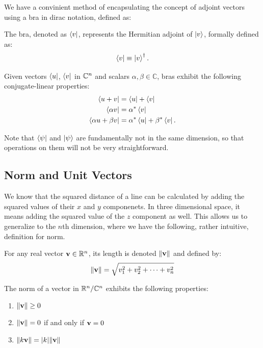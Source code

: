 \documentclass[12pt]{article}
\begin{document}
We have a convinient method of encapsulating the concept of adjoint vectors using a bra in dirac notation, defined as:

\begin{definition}[Bra]
The bra, denoted as $\bra{v}$, represents the Hermitian adjoint of $\ket{v}$, formally defined as:
\[
\bra{v} \equiv \ket{v}^\dagger.
\]
\end{definition}

\begin{theorem}
    Given vectors $\bra{u}$, $\bra{v}$ in $\mathbb{C}^n$ and scalars $\alpha, \beta \in \mathbb{C}$, bras exhibit the following conjugate-linear properties:
        \begin{align}
        \bra{u + v} &= \bra{u} + \bra{v}\\
        \bra{\alpha v} &= \alpha^* \bra{v}\\
        \bra{\alpha u + \beta v} &= \alpha^* \bra{u} + \beta^* \bra{v}.
        \end{align}
\end{theorem}

Note that $\bra{\psi}$ and $\ket{\psi}$ are fundamentally not in the same dimension, so that operations on them will not be very straightforward. 

\subsection{Norm and Unit Vectors}

We know that the squared distance of a line can be calculated by adding the squared values of their $x$ and $y$ componenets. In three dimensional space, it means adding the squared value of the $z$ component as well. This allows us to generalize to the $n$th dimension, where we have the following, rather intuitive, definition for norm. 

\begin{definition}
    For any real vector $\mathbf{v} \in \mathbb{R}^n$, its length is denoted $\left\lVert \mathbf{v} \right\rVert$ and defined by: $$\left\lVert \mathbf{v} \right\rVert = \sqrt{v_1^2 + v_2^2 + \cdots + v_n^2}$$
\end{definition}


\begin{theorem}
    The norm of a vector in $\mathbb{R}^n/\mathbb{C}^n$ exhibits the following properties:
    \begin{enumerate}
        \item $\norm{\mathbf{v}} \geq 0$
        \item $\norm{\mathbf{v}} = 0$ if and only if $\mathbf{v} = 0$
        \item $\norm{k \mathbf{v}} = \abs{k} \norm{\mathbf{v}}$
    \end{enumerate} 
\end{theorem}
\end{document}
